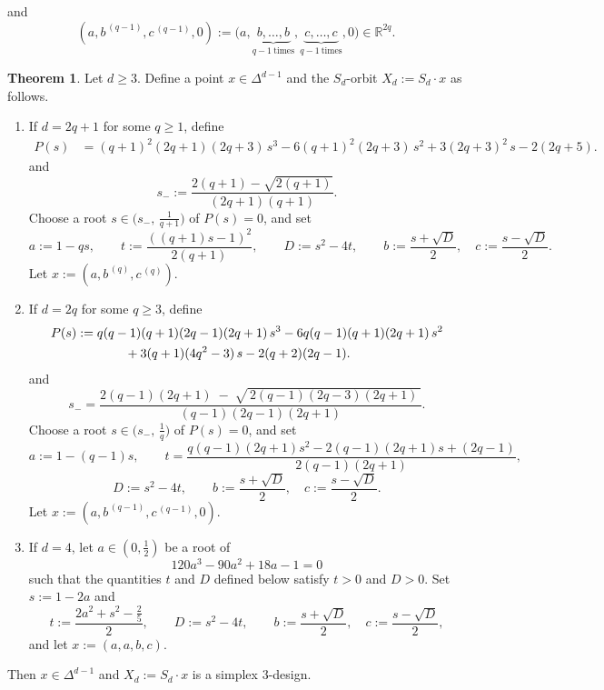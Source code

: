 \documentclass{amsart}
\theoremstyle{definition}
\newtheorem{theorem}{Theorem}[section]
\theoremstyle{remark}
\numberwithin{equation}{section}
\newcommand{\R}{{\mathbb R}}
\begin{document}
and
\[
(a,b^{\,(q-1)},c^{\,(q-1)},0)
:=
\bigl(a,\underbrace{b,\ldots,b}_{q-1\ \text{times}},\underbrace{c,\ldots,c}_{q-1\ \text{times}},0\bigr)\in\R^{2q}.
\]
\begin{theorem}\label{thm:simplex3design}
Let $d\ge3$.
Define a point $x\in\Delta^{d-1}$ and the $S_d$-orbit $X_d:=S_d\cdot x$ as follows.
\begin{enumerate}
\item[(i)] If $d=2q+1$ for some $q\ge1$, define
\begin{align*}
P(s)
&=(q+1)^2(2q+1)(2q+3)\,s^3
-6(q+1)^2(2q+3)\,s^2
+3(2q+3)^2\,s
-2(2q+5).
\end{align*}
and
\[
s_-:=\frac{2(q+1)-\sqrt{2(q+1)}}{(2q+1)(q+1)}.
\]
Choose a root $s\in\bigl(s_-,\,\frac1{q+1}\bigr)$ of $P(s)=0$, and set
\[
a:=1-qs,\qquad
t:=\frac{((q+1)s-1)^2}{2(q+1)},\qquad
D:=s^2-4t,\qquad
b:=\frac{s+\sqrt{D}}2,\quad c:=\frac{s-\sqrt{D}}2.
\]
Let $x:=(a,b^{\,(q)},c^{\,(q)})$.

\item[(ii)] If $d=2q$ for some $q\ge3$, define
\begin{align*}
P(s)
&:= q(q-1)(q+1)(2q-1)(2q+1)\, s^3
 -6q(q-1)(q+1)(2q+1)\, s^2 \\
&\hspace{3.8em}
 +3(q+1)(4q^2-3)\, s
 -2(q+2)(2q-1).
\end{align*}
and
\[
s_-=\frac{2(q-1)(2q+1)\;-\;\sqrt{\,2(q-1)(2q-3)(2q+1)\,}}{(q-1)(2q-1)(2q+1)}.
\]
Choose a root $s\in\bigl(s_-,\,\frac1q\bigr)$ of $P(s)=0$, and set
\[
a:=1-(q-1)s,\qquad
t=\frac{q(q-1)(2q+1)s^2-2(q-1)(2q+1)s+(2q-1)}{2(q-1)(2q+1)},
\]
\[
D:=s^2-4t,\qquad
b:=\frac{s+\sqrt{D}}2,\quad c:=\frac{s-\sqrt{D}}2.
\]
Let $x:=(a,b^{\,(q-1)},c^{\,(q-1)},0)$.

\item[(iii)] If $d=4$, let $a\in(0,\tfrac12)$ be a root of
\[
120a^3-90a^2+18a-1=0
\]
such that the quantities $t$ and $D$ defined below satisfy $t>0$ and $D>0$.
Set $s:=1-2a$ and
\[
t:=\frac{2a^2+s^2-\frac{2}{5}}{2},\qquad
D:=s^2-4t,\qquad
b:=\frac{s+\sqrt D}{2},\quad c:=\frac{s-\sqrt D}{2},
\]
and let $x:=(a,a,b,c)$.
\end{enumerate}
Then $x\in\Delta^{d-1}$ and $X_d:=S_d\cdot x$ is a simplex $3$-design.
\end{theorem}
\end{document}
